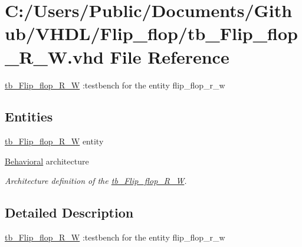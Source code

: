 \hypertarget{tb___flip__flop___r___w_8vhd}{}\section{C\+:/\+Users/\+Public/\+Documents/\+Github/\+V\+H\+D\+L/\+Flip\+\_\+flop/tb\+\_\+\+Flip\+\_\+flop\+\_\+\+R\+\_\+W.vhd File Reference}
\label{tb___flip__flop___r___w_8vhd}


\hyperlink{classtb___flip__flop___r___w}{tb\+\_\+\+Flip\+\_\+flop\+\_\+\+R\+\_\+W} \+:testbench for the entity flip\+\_\+flop\+\_\+r\+\_\+w  


\subsection*{Entities}
\begin{DoxyCompactItemize}
\item 
\hyperlink{classtb___flip__flop___r___w}{tb\+\_\+\+Flip\+\_\+flop\+\_\+\+R\+\_\+W} entity
\item 
\hyperlink{classtb___flip__flop___r___w_1_1_behavioral}{Behavioral} architecture
\begin{DoxyCompactList}\small\item\em Architecture definition of the \hyperlink{classtb___flip__flop___r___w}{tb\+\_\+\+Flip\+\_\+flop\+\_\+\+R\+\_\+W}. \end{DoxyCompactList}\end{DoxyCompactItemize}


\subsection{Detailed Description}
\hyperlink{classtb___flip__flop___r___w}{tb\+\_\+\+Flip\+\_\+flop\+\_\+\+R\+\_\+W} \+:testbench for the entity flip\+\_\+flop\+\_\+r\+\_\+w 

